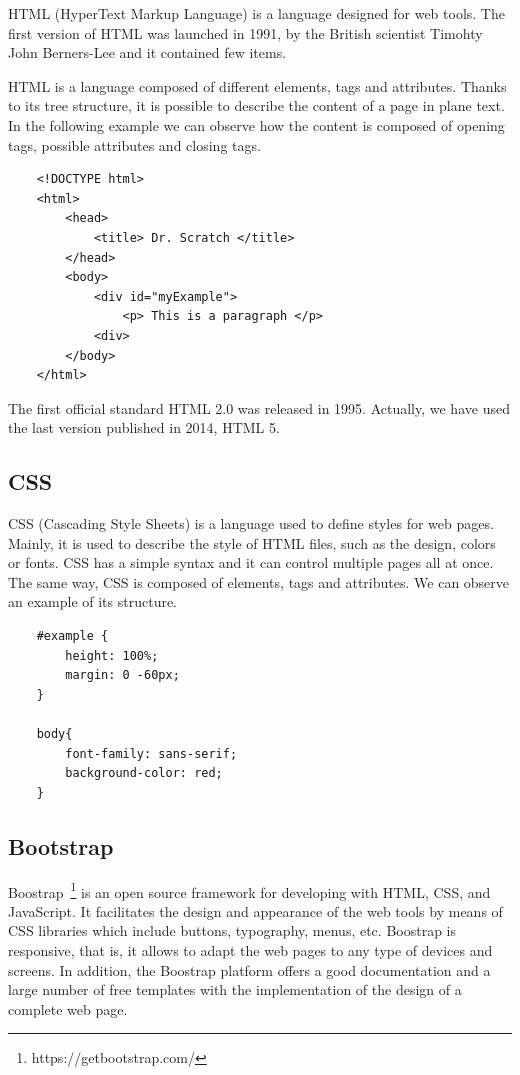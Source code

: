 HTML (HyperText Markup Language) is a language designed for web tools. The first version of HTML was launched in 1991, by the British scientist Timohty John Berners-Lee and it contained few items. 

HTML is a language composed of different elements, tags and attributes. Thanks to its tree structure, it is possible to describe the content of a page in plane text. In the following example we can observe how the content is composed of opening tags, possible attributes and closing tags. 

{\footnotesize
\begin{verbatim}
    <!DOCTYPE html>
    <html>
        <head>
            <title> Dr. Scratch </title>
        </head>
        <body>
            <div id="myExample">
                <p> This is a paragraph </p>
            <div>
        </body>
    </html>        
\end{verbatim}
}

The first official standard HTML 2.0 was released in 1995. Actually, we have used the last version published in 2014, HTML 5.


\subsection{CSS}
\label{subsec:css}

CSS (Cascading Style Sheets) is a language used to define styles for web pages. Mainly, it is used to describe the style of HTML files, such as the design, colors or fonts. CSS has a simple syntax and it can control multiple pages all at once. The same way, CSS is composed of elements, tags and attributes. We can observe an example of its structure.  

{\footnotesize
\begin{verbatim}
    #example {
        height: 100%;
        margin: 0 -60px;
    } 
    
    body{
        font-family: sans-serif;
        background-color: red;
    }
\end{verbatim}
}

\subsection{Bootstrap}
\label{subsec:bootstrap}

Boostrap~\footnote{https://getbootstrap.com/} is an open source framework for developing with HTML, CSS, and JavaScript. It facilitates the design and appearance of the web tools by means of CSS libraries which include buttons, typography, menus, etc. Boostrap is responsive, that is, it allows to adapt the web pages to any type of devices and screens.
In addition, the Boostrap platform offers a good documentation and a large number of free templates with the implementation of the design of a complete web page. 


